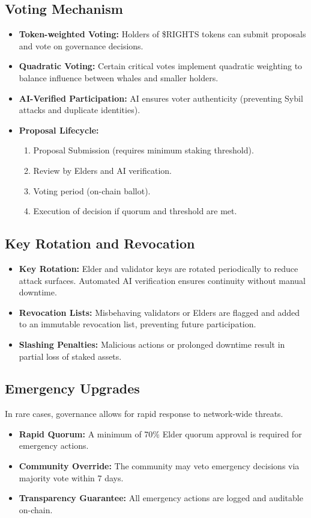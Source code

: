 \documentclass[11pt,a4paper]{article}
\begin{document}
\subsection{Voting Mechanism}
\begin{itemize}
    \item \textbf{Token-weighted Voting:} Holders of \$RIGHTS tokens can submit proposals and vote on governance decisions.  
    \item \textbf{Quadratic Voting:} Certain critical votes implement quadratic weighting to balance influence between whales and smaller holders.  
    \item \textbf{AI-Verified Participation:} AI ensures voter authenticity (preventing Sybil attacks and duplicate identities).  
    \item \textbf{Proposal Lifecycle:}  
    \begin{enumerate}
        \item Proposal Submission (requires minimum staking threshold).  
        \item Review by Elders and AI verification.  
        \item Voting period (on-chain ballot).  
        \item Execution of decision if quorum and threshold are met.  
    \end{enumerate}
\end{itemize}

\subsection{Key Rotation and Revocation}
\begin{itemize}
    \item \textbf{Key Rotation:} Elder and validator keys are rotated periodically to reduce attack surfaces. Automated AI verification ensures continuity without manual downtime.  
    \item \textbf{Revocation Lists:} Misbehaving validators or Elders are flagged and added to an immutable revocation list, preventing future participation.  
    \item \textbf{Slashing Penalties:} Malicious actions or prolonged downtime result in partial loss of staked assets.  
\end{itemize}

\subsection{Emergency Upgrades}
In rare cases, governance allows for rapid response to network-wide threats.  
\begin{itemize}
    \item \textbf{Rapid Quorum:} A minimum of 70\% Elder quorum approval is required for emergency actions.  
    \item \textbf{Community Override:} The community may veto emergency decisions via majority vote within 7 days.  
    \item \textbf{Transparency Guarantee:} All emergency actions are logged and auditable on-chain.  
\end{itemize}
\end{document}
